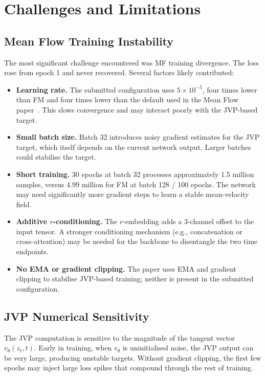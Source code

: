﻿\chapter{Challenges and Limitations}

\section{Mean Flow Training Instability}

The most significant challenge encountered was MF training divergence. The loss
rose from epoch 1 and never recovered. Several factors likely contributed:

\begin{itemize}
  \item \textbf{Learning rate.} The submitted configuration uses
        $5\!\times\!10^{-5}$, four times lower than FM and four times lower than
        the default used in the Mean Flow paper~\cite{geng2025mean}. This slows
        convergence and may interact poorly with the JVP-based target.
  \item \textbf{Small batch size.} Batch 32 introduces noisy gradient estimates
        for the JVP target, which itself depends on the current network output.
        Larger batches could stabilise the target.
  \item \textbf{Short training.} 30 epochs at batch 32 processes approximately
        1.5 million samples, versus 4.99 million for FM at batch 128 / 100 epochs.
        The network may need significantly more gradient steps to learn a stable
        mean-velocity field.
  \item \textbf{Additive $r$-conditioning.} The $r$-embedding adds a 3-channel
        offset to the input tensor. A stronger conditioning mechanism (e.g.,
        concatenation or cross-attention) may be needed for the backbone to
        disentangle the two time endpoints.
  \item \textbf{No EMA or gradient clipping.} The paper uses EMA and gradient
        clipping to stabilise JVP-based training; neither is present in the
        submitted configuration.
\end{itemize}

\section{JVP Numerical Sensitivity}

The JVP computation is sensitive to the magnitude of the tangent vector
$v_\theta(z_t, t)$. Early in training, when $v_\theta$ is uninitialised noise,
the JVP output can be very large, producing unstable targets. Without gradient
clipping, the first few epochs may inject large loss spikes that compound through
the rest of training.

